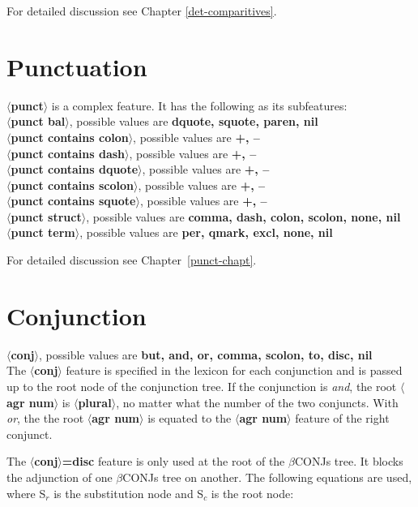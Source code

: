 For detailed discussion see Chapter \ref{det-comparitives}.

\section{Punctuation}
{\bf $\langle$punct$\rangle$} is a complex feature. It has the following
as its subfeatures:\\
{\bf $\langle$punct bal$\rangle$}, possible values are {\bf dquote,
squote, paren, nil}\\
{\bf $\langle$punct contains colon$\rangle$}, possible values are {\bf +, --}\\
{\bf $\langle$punct contains dash$\rangle$}, possible values are {\bf +, --}\\
{\bf $\langle$punct contains dquote$\rangle$}, possible values are {\bf +, --}\\
{\bf $\langle$punct contains scolon$\rangle$}, possible values are {\bf +, --}\\
{\bf $\langle$punct contains squote$\rangle$}, possible values are {\bf +, --}\\
{\bf $\langle$punct struct$\rangle$}, possible values are {\bf comma,
dash, colon, scolon, none, nil}\\
{\bf $\langle$punct term$\rangle$}, possible values are {\bf per, qmark, excl, 
none, nil}

For detailed discussion see Chapter~\ref{punct-chapt}.


\section{Conjunction}
{\bf $\langle$conj$\rangle$}, possible values are {\bf but, and, or,
comma, scolon, to, disc, nil}\\
The {\bf $\langle$conj$\rangle$} feature is specified in the lexicon
for each conjunction and is passed up to the root node 
of the conjunction tree. If the conjunction is {\em and}, the 
root {\bf $\langle$agr num$\rangle$} is {\bf $\langle$plural$\rangle$}, no
matter what the number of the two conjuncts. With {\em or}, the
the root {\bf $\langle$agr num$\rangle$} is equated to the
{\bf $\langle$agr num$\rangle$} feature of the right conjunct. 


The {\bf $\langle$conj$\rangle$=disc} feature is only used at the root
of  the
$\beta$CONJs tree.  It blocks the adjunction of one $\beta$CONJs tree
on another.  The following equations are used, where S$_{r}$ is
the substitution node and S$_{c}$ is the root node:


